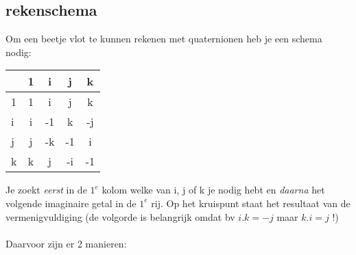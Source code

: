 \documentclass[hidelinks, a4wide, 12pt,  twoside]{book}
\begin{document}
\subsection{rekenschema}
Om een beetje vlot te kunnen rekenen met quaternionen heb je een schema nodig:
\begin{center}
	\begin{tabular}{ | l || c | c |c |c |}
		\hline
		& 1 & i & j & k \\ \hline \hline
		1 & 1 & i & j & k \\ \hline
		i & i & -1 & k & -j\\ \hline
		j & j & -k & -1 & i\\ \hline
		k & k & j & -i & -1\\ 
		\hline 
	\end{tabular}
\end{center}

Je zoekt \textit{eerst} in de $ 1^e $ kolom welke van i, j of k je nodig hebt en \textit{daarna} het volgende  imaginaire getal in de $ 1^e $ rij.  Op het kruispunt staat het resultaat van de vermenigvuldiging (de volgorde is belangrijk omdat bv $  i.k = -j $ maar $ k.i = j  $ !) \\ \\
Daarvoor zijn er 2 manieren:\\
\end{document}
